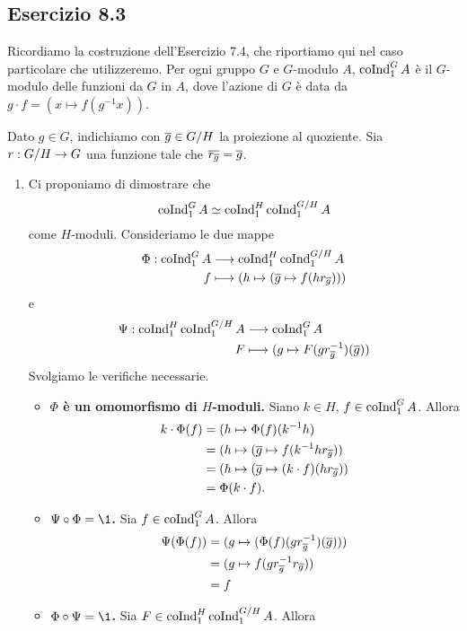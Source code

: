 \documentclass[a4paper]{article}
\begin{document}
\subsection*{Esercizio 8.3}
Ricordiamo la costruzione dell'Esercizio 7.4, che riportiamo qui nel caso particolare che utilizzeremo. Per ogni gruppo $G$ e $G$-modulo $A$, $\operatorname{coInd}_1^GA$ è il $G$-modulo delle funzioni da $G$ in $A$, dove l'azione di $G$ è data da $g\cdot f=(x\mapsto f(g^{-1}x))$.

Dato $g\in G$, indichiamo con $\overline{g}\in G/H$ la proiezione al quoziente. Sia $r:G/H\rightarrow G$ una funzione tale che $\overline{r_{\overline{g}}}=\overline{g}$.
\begin{enumerate}[(1)]
\item Ci proponiamo di dimostrare che
$$
\operatorname{coInd}_1^GA\simeq\operatorname{coInd}_1^H\operatorname{coInd}_1^{G/H}A
$$
come $H$-moduli. Consideriamo le due mappe
\begin{align*}
\Phi:\operatorname{coInd}_1^GA&\longrightarrow\operatorname{coInd}_1^H\operatorname{coInd}_1^{G/H}A\\
f&\longmapsto(h\mapsto(\overline{g}\mapsto f(hr_{\overline{g}})))
\end{align*}
e
\begin{align*}
\Psi:\operatorname{coInd}_1^H\operatorname{coInd}_1^{G/H}A&\longrightarrow\operatorname{coInd}_1^GA\\
F&\longmapsto(g\mapsto F(gr_{\overline{g}}^{-1})(\overline{g}))
\end{align*}
Svolgiamo le verifiche necessarie.
\begin{itemize}
\item \textbf{$\Phi$ è un omomorfismo di $H$-moduli.} Siano $k\in H$, $f\in\operatorname{coInd}_1^GA$. Allora
\begin{align*}
k\cdot\Phi(f)&=(h\mapsto\Phi(f)(k^{-1}h)\\
&=(h\mapsto(\overline{g}\mapsto f(k^{-1}hr_{\overline{g}}))\\
&=(h\mapsto(\overline{g}\mapsto (k\cdot f)(hr_{\overline{g}}))\\
&=\Phi(k\cdot f).
\end{align*}
\item \textbf{$\Psi\circ\Phi=\1$.} Sia $f\in\operatorname{coInd}_1^GA$. Allora
\begin{align*}
\Psi(\Phi(f))&=(g\mapsto(\Phi(f)(gr_{\overline{g}}^{-1})(\overline{g})))\\
&=(g\mapsto f(gr_{\overline{g}}^{-1}r_{\overline{g}}))\\
&=f
\end{align*}
\item \textbf{$\Phi\circ\Psi=\1$.} Sia $F\in\operatorname{coInd}_1^H\operatorname{coInd}_1^{G/H}A$. Allora
\begin{align*}

\end{align*}
\end{itemize}
\end{enumerate}
\end{document}
